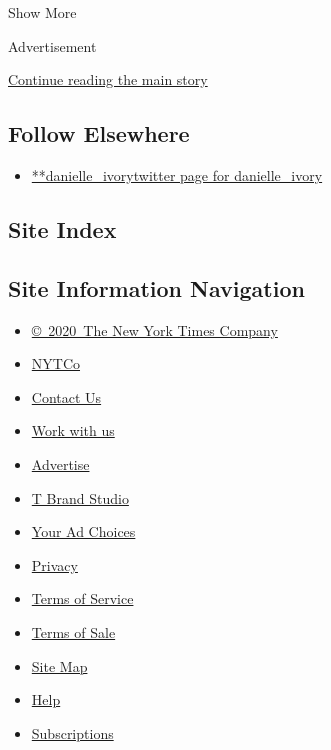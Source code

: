 Show More

Advertisement

\protect\hyperlink{after-mid2}{Continue reading the main story}

\hypertarget{follow-elsewhere}{%
\subsection{Follow Elsewhere}\label{follow-elsewhere}}

\begin{itemize}
\tightlist
\item
  \href{https://twitter.com/danielle_ivory}{**danielle\_ivorytwitter
  page for danielle\_ivory}
\end{itemize}

\hypertarget{site-index}{%
\subsection{Site Index}\label{site-index}}

\hypertarget{site-information-navigation}{%
\subsection{Site Information
Navigation}\label{site-information-navigation}}

\begin{itemize}
\tightlist
\item
  \href{https://help.nytimes.com/hc/en-us/articles/115014792127-Copyright-notice}{©~2020~The
  New York Times Company}
\end{itemize}

\begin{itemize}
\tightlist
\item
  \href{https://www.nytco.com/}{NYTCo}
\item
  \href{https://help.nytimes.com/hc/en-us/articles/115015385887-Contact-Us}{Contact
  Us}
\item
  \href{https://www.nytco.com/careers/}{Work with us}
\item
  \href{https://nytmediakit.com/}{Advertise}
\item
  \href{http://www.tbrandstudio.com/}{T Brand Studio}
\item
  \href{https://www.nytimes.com/privacy/cookie-policy\#how-do-i-manage-trackers}{Your
  Ad Choices}
\item
  \href{https://www.nytimes.com/privacy}{Privacy}
\item
  \href{https://help.nytimes.com/hc/en-us/articles/115014893428-Terms-of-service}{Terms
  of Service}
\item
  \href{https://help.nytimes.com/hc/en-us/articles/115014893968-Terms-of-sale}{Terms
  of Sale}
\item
  \href{https://spiderbites.nytimes.com}{Site Map}
\item
  \href{https://help.nytimes.com/hc/en-us}{Help}
\item
  \href{https://www.nytimes.com/subscription?campaignId=37WXW}{Subscriptions}
\end{itemize}
